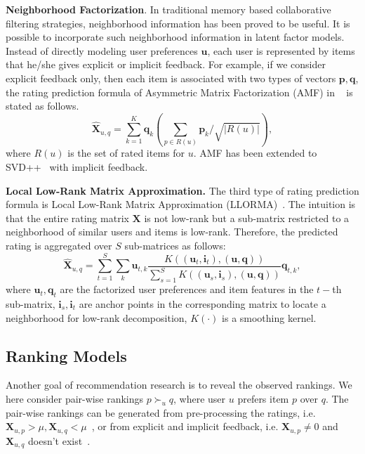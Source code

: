 \documentclass[letterpaper]{article} %
\newcommand{\Rating}{\mathbf{X}}
\begin{document}
\textbf{Neighborhood Factorization}. In traditional memory based collaborative filtering strategies, neighborhood information has been proved to be useful. It is possible  to incorporate such neighborhood information in latent factor models. Instead of directly modeling user preferences $\mathbf{u}$, each user is represented by items that he/she gives explicit or implicit feedback. For example, if we consider explicit feedback only, then each item is associated with two types of vectors $\mathbf{p},\mathbf{q}$, the rating prediction formula of Asymmetric Matrix Factorization (AMF) in ~\cite{Koren2008Factorization} is stated as follows.  
 \begin{equation}\label{equ:AMF}
\hat{\Rating}_{u,q}=\sum_{k=1}^{K} \mathbf{q}_{k} (\sum_{p \in R(u)} \mathbf{p}_k/\sqrt{|R(u)|} ),
\end{equation}
where  $R(u)$ is the set of rated items for $u$. AMF has been extended to SVD++~\cite{Koren2008Factorization} with implicit feedback. 

\textbf{Local Low-Rank Matrix Approximation.} The third type of rating prediction formula is  Local Low-Rank Matrix Approximation (LLORMA)~\cite{Lee2013Local}. The intuition is that the entire rating matrix $\Rating$ is not low-rank but a sub-matrix restricted to a neighborhood of similar users and items is low-rank.  Therefore, the predicted rating is aggregated over $S$ sub-matrices  as follows:
\begin{equation}\label{equ:LLORMA}
\hat{\Rating}_{u,q} = \sum_{t=1}^{S} \sum_k \mathbf{u}_{t, k} \frac{K((\mathbf{u}_t,\mathbf{i}_t),(\mathbf{u},\mathbf{q}))}{\sum_{s=1}^{S} K((\mathbf{u}_s,\mathbf{i}_s),(\mathbf{u},\mathbf{q}))} \mathbf{q}_{t,k},
\end{equation}
where $\mathbf{u}_t, \mathbf{q}_t$ are the factorized user preferences and item features in the $t-$th sub-matrix,  $\mathbf{i}_s,\mathbf{i}_t$ are anchor points in the corresponding matrix to locate a neighborhood for low-rank decomposition, $K(\cdot)$ is a smoothing kernel. 


\subsection{Ranking Models}
Another goal of recommendation research is to reveal the observed rankings. We here consider pair-wise rankings $p\succ_u q$, where user $u$ prefers item $p$ over $q$. The pair-wise rankings can be generated from pre-processing  the ratings, i.e. $\Rating_{u,p}> \mu, \Rating_{u,q}<\mu$~\cite{Hu2017Decoupled}, or from explicit and implicit feedback, i.e. $\Rating_{u,p}\neq 0$ and $ \Rating_{u,q}$ doesn't exist~\cite{Rendle2009BPR}. 
\end{document}
